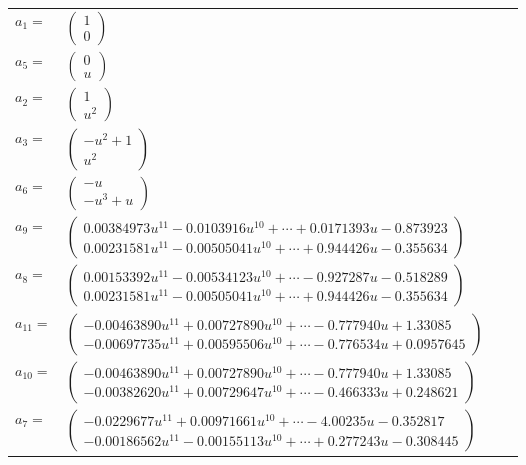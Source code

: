 \documentclass[1p]{elsarticle_modified}
\theoremstyle{definition}
\begin{document}
\begin{tabular}{m{7pt} m{180pt} m{7pt} m{180pt} }
\flushright $a_{1}=$&$\begin{pmatrix}1\\0\end{pmatrix}$ \\
\flushright $a_{5}=$&$\begin{pmatrix}0\\u\end{pmatrix}$ \\
\flushright $a_{2}=$&$\begin{pmatrix}1\\u^2\end{pmatrix}$ \\
\flushright $a_{3}=$&$\begin{pmatrix}- u^2+1\\u^2\end{pmatrix}$ \\
\flushright $a_{6}=$&$\begin{pmatrix}- u\\- u^3+u\end{pmatrix}$ \\
\flushright $a_{9}=$&$\begin{pmatrix}0.00384973 u^{11}-0.0103916 u^{10}+\cdots+0.0171393 u-0.873923\\0.00231581 u^{11}-0.00505041 u^{10}+\cdots+0.944426 u-0.355634\end{pmatrix}$ \\
\flushright $a_{8}=$&$\begin{pmatrix}0.00153392 u^{11}-0.00534123 u^{10}+\cdots-0.927287 u-0.518289\\0.00231581 u^{11}-0.00505041 u^{10}+\cdots+0.944426 u-0.355634\end{pmatrix}$ \\
\flushright $a_{11}=$&$\begin{pmatrix}-0.00463890 u^{11}+0.00727890 u^{10}+\cdots-0.777940 u+1.33085\\-0.00697735 u^{11}+0.00595506 u^{10}+\cdots-0.776534 u+0.0957645\end{pmatrix}$ \\
\flushright $a_{10}=$&$\begin{pmatrix}-0.00463890 u^{11}+0.00727890 u^{10}+\cdots-0.777940 u+1.33085\\-0.00382620 u^{11}+0.00729647 u^{10}+\cdots-0.466333 u+0.248621\end{pmatrix}$ \\
\flushright $a_{7}=$&$\begin{pmatrix}-0.0229677 u^{11}+0.00971661 u^{10}+\cdots-4.00235 u-0.352817\\-0.00186562 u^{11}-0.00155113 u^{10}+\cdots+0.277243 u-0.308445\end{pmatrix}$ \\

\end{tabular}
\end{document}
